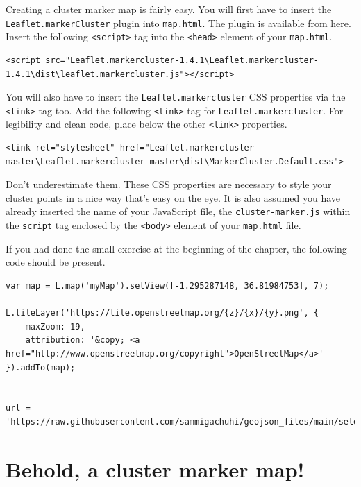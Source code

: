 \documentclass[
]{book}
\begin{document}
Creating a cluster marker map is fairly easy. You will first have to insert the \texttt{Leaflet.markerCluster} plugin into \texttt{map.html}. The plugin is available from \href{https://github.com/Leaflet/Leaflet.markercluster/archive/refs/heads/master.zip}{here}. Insert the following \texttt{\textless{}script\textgreater{}} tag into the \texttt{\textless{}head\textgreater{}} element of your \texttt{map.html}.

\begin{verbatim}
<script src="Leaflet.markercluster-1.4.1\Leaflet.markercluster-1.4.1\dist\leaflet.markercluster.js"></script>
\end{verbatim}

You will also have to insert the \texttt{Leaflet.markercluster} CSS properties via the \texttt{\textless{}link\textgreater{}} tag too. Add the following \texttt{\textless{}link\textgreater{}} tag for \texttt{Leaflet.markercluster}. For legibility and clean code, place below the other \texttt{\textless{}link\textgreater{}} properties.

\begin{verbatim}
<link rel="stylesheet" href="Leaflet.markercluster-master\Leaflet.markercluster-master\dist\MarkerCluster.Default.css"> 
\end{verbatim}

Don't underestimate them. These CSS properties are necessary to style your cluster points in a nice way that's easy on the eye. It is also assumed you have already inserted the name of your JavaScript file, the \texttt{cluster-marker.js} within the \texttt{script} tag enclosed by the \texttt{\textless{}body\textgreater{}} element of your \texttt{map.html} file.

If you had done the small exercise at the beginning of the chapter, the following code should be present.

\begin{verbatim}
var map = L.map('myMap').setView([-1.295287148, 36.81984753], 7);

L.tileLayer('https://tile.openstreetmap.org/{z}/{x}/{y}.png', {
    maxZoom: 19,
    attribution: '&copy; <a href="http://www.openstreetmap.org/copyright">OpenStreetMap</a>'
}).addTo(map);


url = 'https://raw.githubusercontent.com/sammigachuhi/geojson_files/main/selected_hospitals.json'
\end{verbatim}

\hypertarget{behold-a-cluster-marker-map}{%
\section{Behold, a cluster marker map!}\label{behold-a-cluster-marker-map}}
\end{document}
